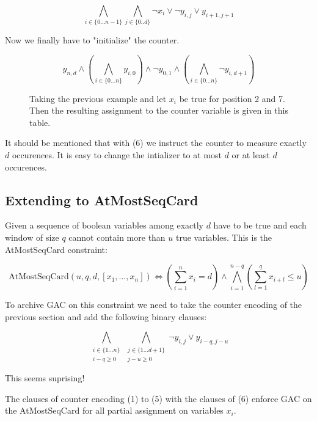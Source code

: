 \documentclass[]{llncs}
\begin{document}
\begin{equation}
    \bigwedge_{i \in \{0\ldots n-1\}} \bigwedge_{j\in\{0..d\}}
    \neg x_{i} \vee \neg y_{i,j} \vee y_{i+1,j+1}
\end{equation}

Now we finally have to "initialize" the counter. 

\begin{equation}
y_{n,d} \wedge \left (\bigwedge_{i\in\{0\ldots n\}} y_{i,0} \right )\wedge \neg
    y_{0,1} \wedge \left(\bigwedge_{i\in\{0\ldots n\}} \neg
        y_{i,d+1}\right )
\end{equation}


\begin{figure}
\centering 
\caption{Taking the previous example and let $x_{i}$ be true for
    position 2 and 7. Then the resulting assignment to the counter
    variable is given in this table. }
%
\end{figure}

It should be mentioned that with (6) we instruct the counter to measure
exactly $d$ occurences. It is easy to change the intializer to at most
$d$ or at least $d$ occurences. 

\subsection{Extending to AtMostSeqCard}

Given a sequence of boolean variables among exactly $d$ have to be true
and each window of size $q$ cannot contain more than $u$ true variables.
This is the AtMostSeqCard constraint: 

$$ \text{AtMostSeqCard}(u,q,d,[x_{1},\ldots,x_{n}]) \iff (\sum_{i=1}^n
x_{i} = d) \wedge \bigwedge_{i=1}^{n-q}(\sum_{l=1}^q x_{i+l} \leq u )$$

To archive GAC on this constraint we need to take the counter encoding
of the previous section and add the following binary clauses:

\begin{equation}
    \bigwedge_{\substack{i \in \{1 \ldots n\} \\ i-q \geq 0}}
    \bigwedge_{\substack{j\in\{1\ldots d+1\}\\ j-u \geq 0}}
    \neg y_{i,j} \vee y_{i-q,j-u}
\end{equation}               

This seems suprising! 

\begin{theorem}
    The clauses of counter encoding (1) to (5) with the clauses of (6)
    enforce GAC on the AtMostSeqCard for all partial assignment on
    variables $x_{i}$. 
\end{theorem}
\end{document}
